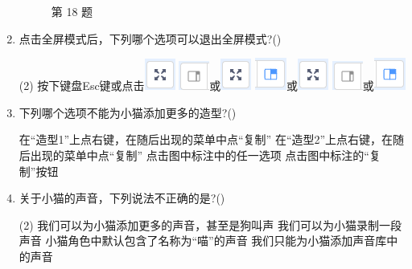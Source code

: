 \documentclass[10pt, a4paper]{article}
\begin{document}
\begin{enumerate}
\begin{figure}[htbp]
\begin{minipage}[t]{.28\textwidth}
                \caption*{第 18 题}
            \end{minipage}
        \end{figure}

        \item 	
        点击全屏模式后，下列哪个选项可以退出全屏模式?(\qquad)
        \begin{tasks}(2)
            \task 按下键盘Esc键或点击\includegraphics[width=.03\textwidth]{17-1.png}
            \task \includegraphics[width=.03\textwidth]{17-2.png}或\includegraphics[width=.03\textwidth]{17-1.png}
            \task \includegraphics[width=.03\textwidth]{17-3.png}或\includegraphics[width=.03\textwidth]{17-1.png}
            \task \includegraphics[width=.03\textwidth]{17-2.png}或\includegraphics[width=.03\textwidth]{17-3.png}
        \end{tasks}

        \item 下列哪个选项不能为小猫添加更多的造型?(\qquad)
        \begin{tasks}
            \task 在“造型1”上点右键，在随后出现的菜单中点“复制”
            \task 在“造型2”上点右键，在随后出现的菜单中点“复制”
            \task 点击图中标注中的任一选项
            \task 点击图中标注的“复制”按钮
        \end{tasks}

        \item 关于小猫的声音，下列说法不正确的是?(\qquad)
        \begin{tasks}(2)
            \task 我们可以为小猫添加更多的声音，甚至是狗叫声
            \task 我们可以为小猫录制一段声音
            \task 小猫角色中默认包含了名称为“喵”的声音
            \task 我们只能为小猫添加声音库中的声音
        \end{tasks}


\end{enumerate}
\end{document}

